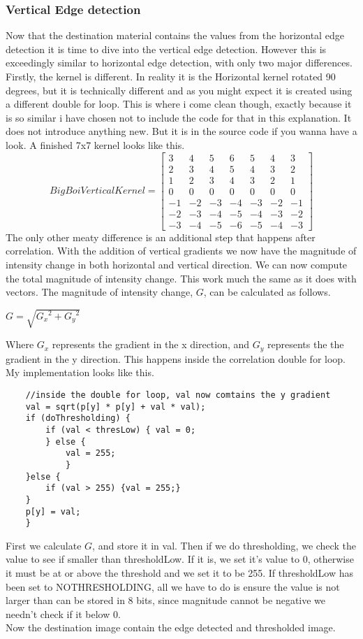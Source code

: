 \documentclass{article}
\begin{document}
\subsubsection{Vertical Edge detection}
Now that the destination material contains the values from the horizontal edge detection it is time to dive into the vertical edge detection. However this is exceedingly similar to horizontal edge detection, with only two major differences. Firstly, the kernel is different. In reality it is the Horizontal kernel rotated 90 degrees, but it is technically different and as you might expect it is created using a different double for loop. This is where i come clean though, exactly because it is so similar i have chosen not to include the code for that in this explanation. It does not introduce anything new. But it is in the source code if you wanna have a look. A finished 7x7 kernel looks like this.\\
\[
BigBoiVerticalKernel=
\begin{bmatrix}
3 & 4 & 5 & 6 & 5 & 4 & 3\\
2 & 3 & 4 & 5 & 4 & 3 & 2\\
1 & 2 & 3 & 4 & 3 & 2 & 1\\
0 & 0 & 0 & 0 & 0 & 0 & 0\\
-1& -2& -3& -4& -3 & -2 & -1\\
-2& -3& -4& -5& -4 & -3 & -2\\
-3& -4& -5& -6& -5 & -4 & -3
\end{bmatrix}
\]
The only other meaty difference is an additional step that happens after correlation. With the addition of vertical gradients we now have the magnitude of intensity change in both horizontal and vertical direction. We can now compute the total magnitude of intensity change. This work much the same as it does with vectors. The magnitude of intensity change, \(G\), can be calculated as follows.\\
\begin{center}
	\(G = \sqrt{{G_x}^2 + {G_y}^2}\)
\end{center}
Where \({G_x}\) represents the gradient in the x direction, and \({G_y}\) represents the the gradient in the y direction. This happens inside the correlation double for loop. My implementation looks like this.
\begin{lstlisting}
	//inside the double for loop, val now comtains the y gradient 
	val = sqrt(p[y] * p[y] + val * val);
	if (doThresholding) {
		if (val < thresLow) { val = 0;
		} else {
			val = 255;
			}
	}else {
		if (val > 255) {val = 255;}
	}
	p[y] = val;
	}
\end{lstlisting}
First we calculate \(G\), and store it in val. Then if we do thresholding, we check the value to see if smaller than thresholdLow. If it is, we set it's value to 0, otherwise it must be at or above the threshold and we set it to be 255. If thresholdLow has been set to NOTHRESHOLDING, all we have to do is ensure the value is not larger than can be stored in 8 bits, since magnitude cannot be negative we needn't check if it below 0.\\
Now the destination image contain the edge detected and thresholded image.
\end{document}

